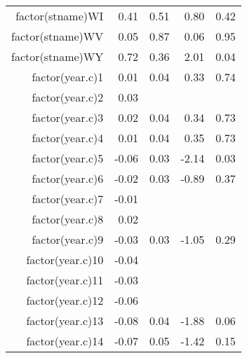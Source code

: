 \begin{table}[ht]
\begin{tabular}{rrrrr}
  factor(stname)WI & 0.41 & 0.51 & 0.80 & 0.42 \\ 
  factor(stname)WV & 0.05 & 0.87 & 0.06 & 0.95 \\ 
  factor(stname)WY & 0.72 & 0.36 & 2.01 & 0.04 \\ 
  factor(year.c)1 & 0.01 & 0.04 & 0.33 & 0.74 \\ 
  factor(year.c)2 & 0.03 &  &  &  \\ 
  factor(year.c)3 & 0.02 & 0.04 & 0.34 & 0.73 \\ 
  factor(year.c)4 & 0.01 & 0.04 & 0.35 & 0.73 \\ 
  factor(year.c)5 & -0.06 & 0.03 & -2.14 & 0.03 \\ 
  factor(year.c)6 & -0.02 & 0.03 & -0.89 & 0.37 \\ 
  factor(year.c)7 & -0.01 &  &  &  \\ 
  factor(year.c)8 & 0.02 &  &  &  \\ 
  factor(year.c)9 & -0.03 & 0.03 & -1.05 & 0.29 \\ 
  factor(year.c)10 & -0.04 &  &  &  \\ 
  factor(year.c)11 & -0.03 &  &  &  \\ 
  factor(year.c)12 & -0.06 &  &  &  \\ 
  factor(year.c)13 & -0.08 & 0.04 & -1.88 & 0.06 \\ 
  factor(year.c)14 & -0.07 & 0.05 & -1.42 & 0.15 \\ 
   \hline
\end{tabular}
\end{table}
